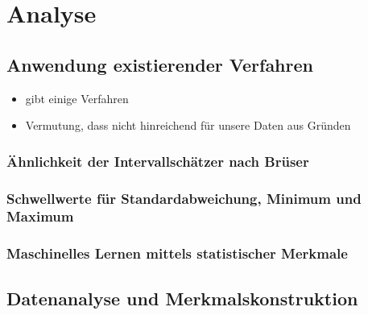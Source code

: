 \chapter{Analyse}\label{analyse}


\section{Anwendung existierender Verfahren}

\begin{itemize}
	\item gibt einige Verfahren
	\item Vermutung, dass nicht hinreichend für unsere Daten	 aus Gründen
\end{itemize}

\subsection{Ähnlichkeit der Intervallschätzer nach Brüser}

\subsection{Schwellwerte für Standardabweichung, Minimum und Maximum}

\subsection{Maschinelles Lernen mittels statistischer Merkmale}

\section{Datenanalyse und Merkmalskonstruktion}


